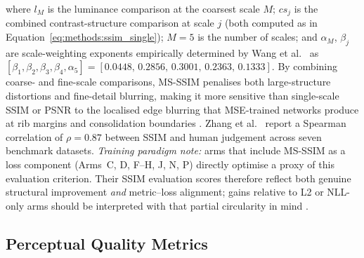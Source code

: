 \documentclass[12pt, a4paper, twoside, openright]{book}
\begin{document}
where $l_M$ is the luminance comparison at the coarsest scale $M$; $cs_j$ is the combined
contrast-structure comparison at scale $j$ (both computed as in Equation~\ref{eq:methods:ssim_single});
$M = 5$ is the number of scales; and $\alpha_M$, $\beta_j$ are scale-weighting exponents
empirically determined by Wang et al.\ \cite{wang_multiscale_2003} as
$[\beta_1, \beta_2, \beta_3, \beta_4, \alpha_5] = [0.0448,\,0.2856,\,0.3001,\,0.2363,\,0.1333]$.
By combining coarse- and fine-scale comparisons, MS-SSIM penalises both large-structure
distortions and fine-detail blurring, making it more sensitive than single-scale SSIM or
PSNR to the localised edge blurring that MSE-trained networks produce at rib margins
and consolidation boundaries \cite{zhao_loss_2017}. Zhang et al.\ \cite{zhang_comprehensive_2012}
report a Spearman correlation of $\rho = 0.87$ between SSIM and human judgement across
seven benchmark datasets. \textit{Training paradigm note:} arms that include MS-SSIM as a loss component (Arms~C, D, F--H, J, N, P) directly optimise a proxy of this evaluation criterion. Their SSIM evaluation scores therefore reflect both genuine structural improvement \emph{and} metric--loss alignment; gains relative to L2 or NLL-only arms should be interpreted with that partial circularity in mind \cite{blau_perception_2018}.

\subsection{Perceptual Quality Metrics}
\label{sec:methods:evaluation:perceptual}
\end{document}
